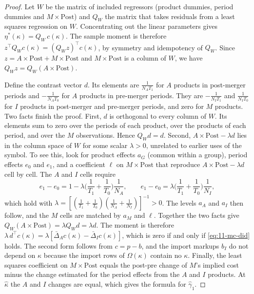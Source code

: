 \begin{proof}
Let $W$ be the matrix of included regressors (product dummies, period dummies and $M \times \text{Post}$) and $Q_W$ the
matrix that takes residuals from a least squares regression on $W$. Concentrating out the linear parameters gives
$\eta^*(\kappa) = Q_W\,c(\kappa)$. The sample moment is therefore $z^\top Q_W c(\kappa) = (Q_W z)^\top c(\kappa)$, by
symmetry and idempotency of $Q_W$. Since $z = A\times\text{Post} + M\times\text{Post}$ and $M\times\text{Post}$ is a
column of $W$, we have $Q_W z = Q_W(A\times\text{Post})$.

Define the contrast vector $d$. Its elements are $\frac{1}{N_A T_1}$ for $A$ products in post-merger periods and
$-\frac{1}{N_A T_0}$ for $A$ products in pre-merger periods. They are $-\frac{1}{N_I T_1}$ and $\frac{1}{N_I T_0}$ for
$I$ products in post-merger and pre-merger periods, and zero for $M$ products. Two facts finish the proof. First, $d$ is
orthogonal to every column of $W$. Its elements sum to zero over the periods of each product, over the products of each
period, and over the $M$ observations. Hence $Q_W d = d$. Second, $A\times\text{Post} - \lambda d$ lies in the column
space of $W$ for some scalar $\lambda > 0$, unrelated to earlier uses of the symbol. To see this, look for product effects $a_G$ (common within a group), period
effects $e_0$ and $e_1$, and a coefficient $\ell$ on $M\times\text{Post}$ that reproduce $A\times\text{Post} -
\lambda d$ cell by cell. The $A$ and $I$ cells require
\begin{equation*}
  e_1 - e_0 = 1 - \lambda\Big(\frac{1}{T_1} + \frac{1}{T_0}\Big)\frac{1}{N_A}, \qquad
  e_1 - e_0 = \lambda\Big(\frac{1}{T_1} + \frac{1}{T_0}\Big)\frac{1}{N_I},
\end{equation*}
which hold with $\lambda = [(\frac{1}{T_1} + \frac{1}{T_0})(\frac{1}{N_A} + \frac{1}{N_I})]^{-1} > 0$. The levels
$a_A$ and $a_I$ then follow, and the $M$ cells are matched by $a_M$ and $\ell$. Together the two facts give $Q_W
(A\times\text{Post}) = \lambda Q_W d = \lambda d$. The moment is therefore $\lambda\, d^\top c(\kappa) = \lambda
[\bar\Delta_A c(\kappa) - \bar\Delta_I c(\kappa)]$, which is zero if and only if \eqref{eq:11-mc-did} holds. The
second form follows from $c = p - b$, and the import markups $b_I$ do not depend on $\kappa$ because the import rows
of $\Omega(\kappa)$ contain no $\kappa$. Finally, the least squares coefficient on $M\times\text{Post}$ equals the
post-pre change of $M$'s implied cost minus the change estimated for the period effects from the $A$ and $I$
products. At $\hat\kappa$ the $A$ and $I$ changes are equal, which gives the formula for $\hat\gamma_1$.
\end{proof}

